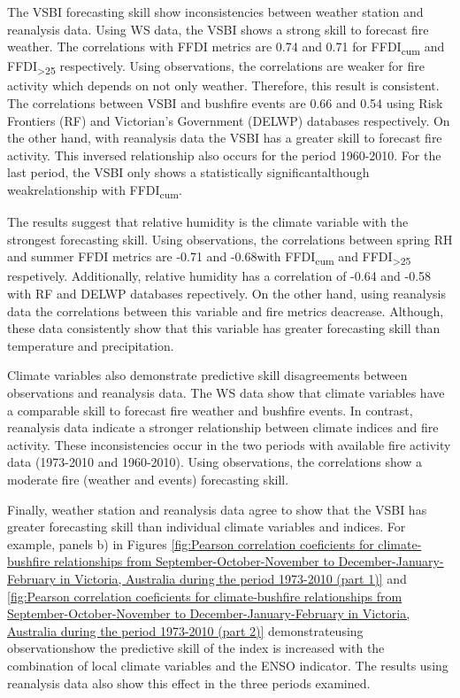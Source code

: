 The VSBI forecasting skill show inconsistencies between weather station
and reanalysis data. Using WS data, the VSBI shows a strong skill
to forecast fire weather. The correlations with FFDI metrics are 0.74
and 0.71 for FFDI\textsubscript{cum} and FFDI\textsubscript{>25}
respectively. Using observations, the correlations are weaker for
fire activity which depends on not only weather. Therefore, this result
is consistent. The correlations between VSBI and bushfire events are
0.66 and 0.54 using Risk Frontiers (RF) and Victorian's Government
(DELWP) databases respectively. On the other hand, with reanalysis
data the VSBI has a greater skill to forecast fire activity. This
inversed relationship also occurs for the period 1960-2010. For the
last period, the VSBI only shows a statistically significant\textemdash although
weak\textemdash relationship with FFDI\textsubscript{cum}. 

The results suggest that relative humidity is the climate variable
with the strongest forecasting skill. Using observations, the correlations
between spring RH and summer FFDI metrics are -0.71 and -0.68\textemdash with
FFDI\textsubscript{cum} and FFDI\textsubscript{>25} respetively\textemdash .
Additionally, relative humidity has a correlation of -0.64 and -0.58
with RF and DELWP databases repectively. On the other hand, using
reanalysis data the correlations between this variable and fire metrics
deacrease. Although, these data consistently show that this variable
has greater forecasting skill than temperature and precipitation. 

Climate variables also demonstrate predictive skill disagreements
between observations and reanalysis data. The WS data show that climate
variables have a comparable skill to forecast fire weather and bushfire
events. In contrast, reanalysis data indicate a stronger relationship
between climate indices and fire activity. These inconsistencies occur
in the two periods with available fire activity data (1973-2010 and
1960-2010). Using observations, the correlations show a moderate
fire (weather and events) forecasting skill. 

Finally, weather station and reanalysis data agree to show that the
VSBI has greater forecasting skill than individual climate variables
and indices. For example, panels b) in Figures \ref{fig:Pearson correlation coeficients for climate-bushfire relationships from September-October-November to December-January-February in Victoria, Australia during the period 1973-2010 (part 1)}
and \ref{fig:Pearson correlation coeficients for climate-bushfire relationships from September-October-November to December-January-February in Victoria, Australia during the period 1973-2010 (part 2)}
demonstrate\textemdash using observations\textemdash how the predictive
skill of the index is increased with the combination of local climate
variables and the ENSO indicator. The results using reanalysis data
also show this effect in the three periods examined.

